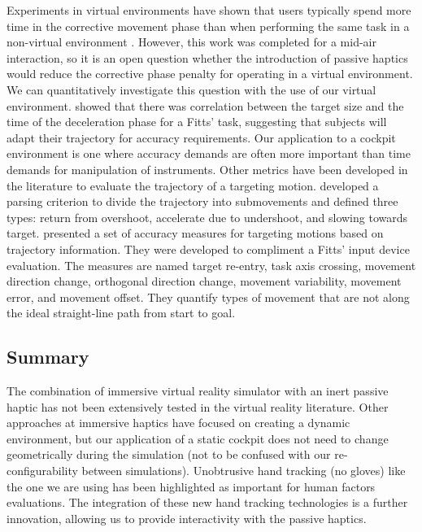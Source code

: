Experiments in virtual environments have shown that users typically spend more time in the corrective movement phase than when performing the same task in a non-virtual environment \citep{liu_comparing_2009}.
However, this work was completed for a mid-air interaction, so it is an open question whether the introduction of passive haptics would reduce the corrective phase penalty for operating in a virtual environment.
We can quantitatively investigate this question with the use of our virtual environment.
\citet{mackenzie_three-dimensional_1987} showed that there was correlation between the target size and the time of the deceleration phase for a Fitts' task, suggesting that subjects will adapt their trajectory for accuracy requirements.
Our application to a cockpit environment is one where accuracy demands are often more important than time demands for manipulation of instruments.
%
%
Other metrics have been developed in the literature to evaluate the trajectory of a targeting motion.
\citet{meyer_optimality_1988} developed a parsing criterion to divide the trajectory into submovements and defined three types: return from overshoot, accelerate due to undershoot, and slowing towards target.
\citet{mackenzie_accuracy_2001} presented a set of accuracy measures for targeting motions based on trajectory information.
They were developed to compliment a Fitts' input device evaluation.
The measures are named target re-entry, task axis crossing, movement direction change, orthogonal direction change, movement variability, movement error, and movement offset.
They quantify types of movement that are not along the ideal straight-line path from start to goal.

\subsection{Summary}
\label{summary}

The combination of immersive virtual reality simulator with an inert passive haptic has not been extensively tested in the virtual reality literature.
Other approaches at immersive haptics have focused on creating a dynamic environment, but our application of a static cockpit does not need to change geometrically during the simulation (not to be confused with our re-configurability between simulations).
Unobtrusive hand tracking (no gloves) like the one we are using has been highlighted as important for human factors evaluations.
The integration of these new hand tracking technologies is a further innovation, allowing us to provide interactivity with the passive haptics.

